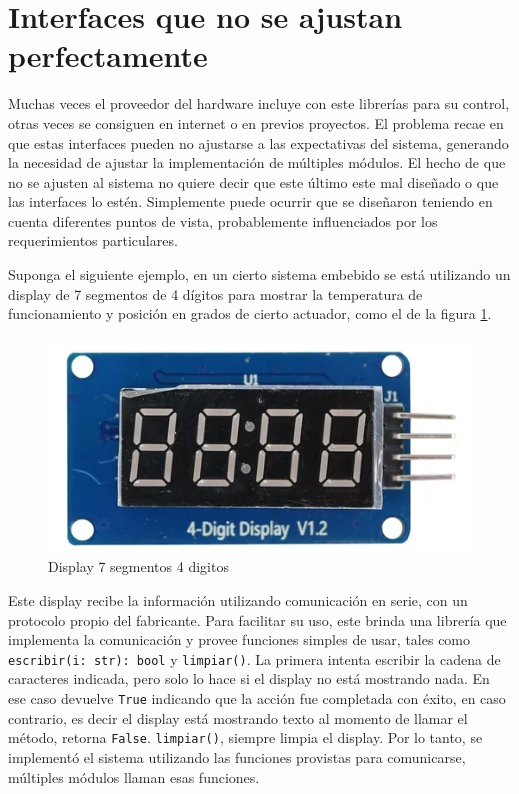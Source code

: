 \section{Interfaces que no se ajustan perfectamente}
Muchas veces el proveedor del hardware incluye con este librerías para su control, otras veces se consiguen en internet o en previos proyectos. El problema recae en que estas interfaces pueden no ajustarse a las expectativas del sistema, generando la necesidad de ajustar la implementación de múltiples módulos. El hecho de que no se ajusten al sistema no quiere decir que este último este mal diseñado o que las interfaces lo estén. Simplemente puede ocurrir que se diseñaron teniendo en cuenta diferentes puntos de vista, probablemente influenciados por los requerimientos particulares.

Suponga el siguiente ejemplo, en un cierto sistema embebido se está utilizando un display de 7 segmentos de 4 dígitos para mostrar la temperatura de funcionamiento y posición en grados de cierto actuador, como el de la figura \ref{fig:enter-label}.

\begin{figure}[h]
    \centering
    \includegraphics[width=0.5\linewidth]{display.png}
    \caption{Display 7 segmentos 4 digitos}
    \label{fig:enter-label}
\end{figure}

Este display recibe la información utilizando comunicación en serie, con un protocolo propio del fabricante. Para facilitar su uso, este brinda una librería que implementa la comunicación y provee funciones simples de usar, tales como \verb|escribir(i: str): bool| y \verb|limpiar()|. La primera intenta escribir la cadena de caracteres indicada, pero solo lo hace si el display no está mostrando nada. En ese caso devuelve \verb|True| indicando que la acción fue completada con éxito, en caso contrario, es decir el display está mostrando texto al momento de llamar el método, retorna \verb|False|. \verb|limpiar()|, siempre limpia el display. Por lo tanto, se implementó el sistema utilizando las funciones provistas para comunicarse, múltiples módulos llaman esas funciones.

